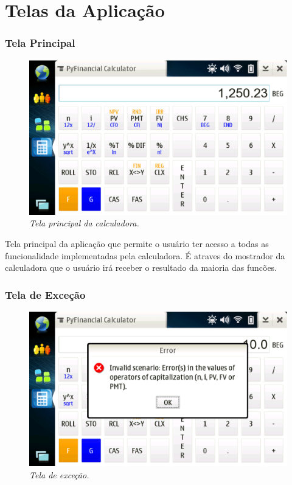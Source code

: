\chapter{Telas da Aplicação}

\subsection{Tela Principal}

\begin{figure}[!h]
 \includegraphics[scale=0.6]{tela_principal.eps}
 \caption{\it Tela principal da calculadora.} \label{tab:tela_principal}
\end{figure}

Tela principal da aplicação que permite o usuário ter acesso a todas as funcionalidade
implementadas pela calculadora. É atraves do mostrador da calculadora que o usuário irá
receber o resultado da maioria das funcões.


\subsection{Tela de Exceção}

\begin{figure}[!h]
 \includegraphics[scale=0.6]{tela_error.eps}
 \caption{\it Tela de exceção.} \label{tab:tela_error}
\end{figure}

